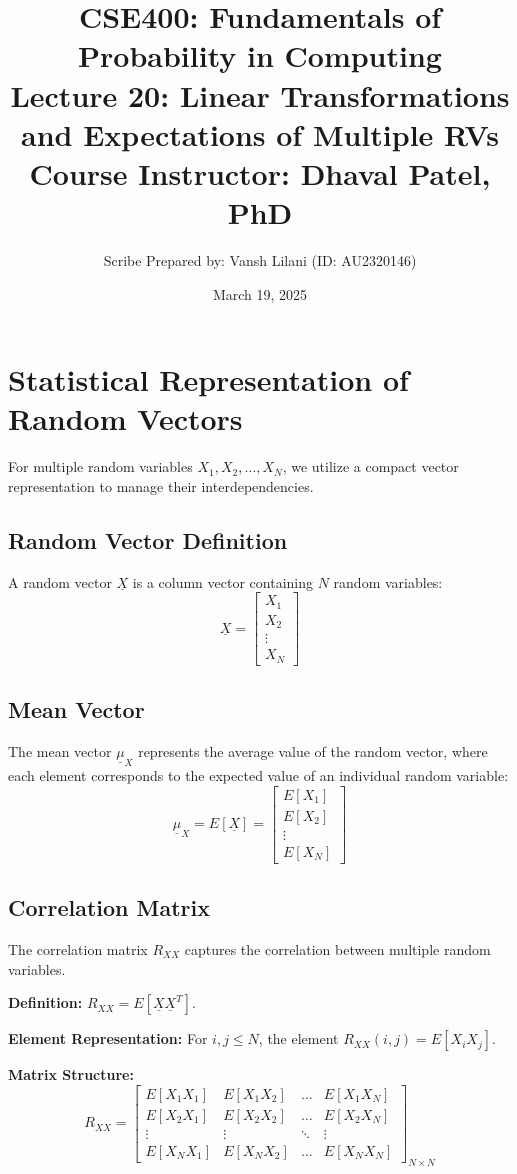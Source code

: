 \documentclass[12pt]{article}
\title{
    \textbf{CSE400: Fundamentals of Probability in Computing} \\
    \large Lecture 20: Linear Transformations and Expectations of Multiple RVs \\
    \normalsize Course Instructor: Dhaval Patel, PhD
}
\author{Scribe Prepared by: Vansh Lilani (ID: AU2320146)}
\date{March 19, 2025}
\begin{document}
\maketitle

\section{Statistical Representation of Random Vectors}
For multiple random variables $X_1, X_2, \dots, X_N$, we utilize a compact vector representation to manage their interdependencies.

\subsection{Random Vector Definition}
A random vector $\underline{X}$ is a column vector containing $N$ random variables:
\[
\underline{X} = \begin{bmatrix} X_1 \\ X_2 \\ \vdots \\ X_N \end{bmatrix} \text{}
\]

\subsection{Mean Vector}
The mean vector $\underline{\mu}_X$ represents the average value of the random vector, where each element corresponds to the expected value of an individual random variable:
\[
\underline{\mu}_X = E[\underline{X}] = \begin{bmatrix} E[X_1] \\ E[X_2] \\ \vdots \\ E[X_N] \end{bmatrix} \text{}
\]

\subsection{Correlation Matrix}
The correlation matrix $R_{XX}$ captures the correlation between multiple random variables.

\textbf{Definition:} $R_{XX} = E[\underline{X}\underline{X}^T]$.

\textbf{Element Representation:} For $i, j \le N$, the element $R_{XX}(i, j) = E[X_iX_j]$.

\textbf{Matrix Structure:}
\[
R_{XX} = \begin{bmatrix} 
E[X_1X_1] & E[X_1X_2] & \dots & E[X_1X_N] \\ 
E[X_2X_1] & E[X_2X_2] & \dots & E[X_2X_N] \\ 
\vdots & \vdots & \ddots & \vdots \\ 
E[X_NX_1] & E[X_NX_2] & \dots & E[X_NX_N] 
\end{bmatrix}_{N \times N} \text{}
\]
\end{document}
